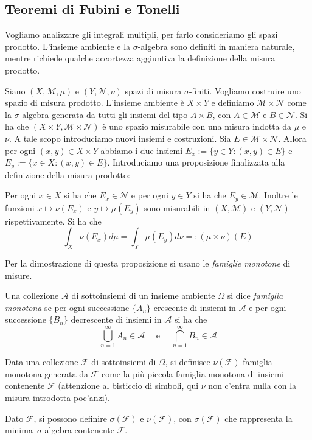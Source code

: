 \subsection{Teoremi di Fubini e Tonelli}
Vogliamo analizzare gli integrali multipli, per farlo consideriamo gli spazi
prodotto. L'insieme ambiente 
e la \(\sigma\)-algebra sono definiti in maniera naturale, mentre richiede qualche accortezza aggiuntiva
la definizione della misura prodotto. 

Siano \((X, \mathcal{M}, \mu)\) e \((Y, \mathcal{N}, \nu)\) spazi di misura
\(\sigma\)-finiti. Vogliamo costruire uno spazio di misura prodotto.
L'insieme ambiente è \(X \times Y\) e definiamo \(\mathcal{M} \times
\mathcal{N}\) come la \(\sigma\)-algebra generata da tutti gli insiemi del tipo
\(A \times B\), con \(A \in \mathcal{M}\) e \(B \in \mathcal{N}\). Si ha che
\((X \times Y, \mathcal{M} \times \mathcal{N})\) è uno spazio misurabile con una 
misura indotta da \(\mu\) e \(\nu\). A tale scopo introduciamo nuovi insiemi e
costruzioni.
Sia \(E \in \mathcal{M} \times \mathcal{N}\). Allora per ogni \((x,y) \in X
\times Y\) abbiamo i due insiemi  \(E_x := \{y \in Y : (x, y)
\in E\} \) e \(E_{y} := \{x \in X : (x, y) \in E\} \). Introduciamo una proposizione finalizzata alla 
definizione della misura prodotto: 
\begin{proposition}\label{prop:def_misura_prodotto}
    Per ogni \(x \in X\) si ha che \(E_x \in \mathcal{N}\) e per ogni \(y
    \in Y\) si ha che \(E_y \in \mathcal{M}\). Inoltre le funzioni \(x \mapsto
    \nu(E_x)\) e \(y \mapsto \mu(E_y)\) sono misurabili in \((X,
    \mathcal{M})\) e \((Y, \mathcal{N})\) rispettivamente. Si ha che
    \[
        \int_X \nu(E_x) d\mu = \int_Y \mu(E_y) d\nu =: (\mu \times \nu)(E)
    \]
\end{proposition}
Per la dimostrazione di questa proposizione si usano le \emph{famiglie
monotone} di misure.
\begin{definition}
Una collezione \(\mathcal{A}\) di sottoinsiemi di un
insieme ambiente \(\Omega\) si dice \emph{famiglia monotona} se per ogni
successione \(\{A_{n}\} \) crescente di insiemi in \(\mathcal{A}\) e per ogni
successione \(\{B_{n}\} \) decrescente di insiemi in \(\mathcal{A}\) si ha che
\[
    \bigcup_{n=1}^{\infty} A_{n} \in \mathcal{A} \quad \text{ e } \quad
    \bigcap_{n=1}^{\infty} B_{n} \in \mathcal{A}
\]
\end{definition}
Data una collezione \(\mathcal{F}\) di sottoinsiemi di \(\Omega\), si definisce
\(\nu(\mathcal{F})\) famiglia monotona generata da \(\mathcal{F}\) come la più
piccola famiglia monotona di insiemi contenente \(\mathcal{F}\) (attenzione al
bisticcio di simboli, qui \(\nu\) non c'entra nulla con la misura introdotta
poc'anzi). 
\begin{remark}
    Dato \(\mathcal{F}\), si possono definire \(\sigma(\mathcal{F})\) e
    \(\nu(\mathcal{F})\), con \(\sigma(\mathcal{F})\) che rappresenta la
    minima~\(\sigma\)-algebra contenente \(\mathcal{F}\).
\end{remark}


